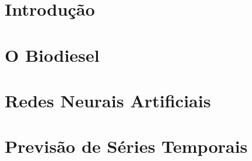 \documentclass[a4paper,12pt,oneside,openany]{book}
\begin{document}
\frontmatter
\thispagestyle{empty}



\pagebreak



\tableofcontents
\listoffigures
\listoftables

\mainmatter
\cleardoublepage
\chapter{Introdução}
\label{cap1}


\chapter{O Biodiesel}
\label{cap2}


\chapter{Redes Neurais Artificiais}
\label{cap3}


\chapter{Previsão de Séries Temporais}
\label{cap4}

\end{document}
